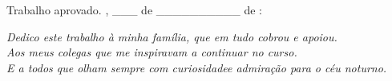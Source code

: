 \documentclass[
	12pt,
	openany,
	oneside,
	a4paper,
	english,
	brazil
]{abntex2}
\begin{document}
\begin{folhadeaprovacao}
  \begin{center}
    {\ABNTEXchapterfont\large\imprimirautor}
    \vspace*{\fill}\vspace*{\fill}
    \begin{center}
      \ABNTEXchapterfont\bfseries\Large\imprimirtitulo
    \end{center}
    \vspace*{\fill}
    \hspace{.45\textwidth}
    \begin{minipage}{.5\textwidth}
        \imprimirpreambulo
    \end{minipage}%
    \vspace*{\fill}
  \end{center}

  Trabalho aprovado. \imprimirlocal, \_\_\_ de \_\_\_\_\_\_\_\_\_\_ de \imprimirdata:


  \begin{center}
    \vspace*{0.5cm}
    {\large\imprimirlocal}
    \par
    {\large\imprimirdata}
    \vspace*{1cm}
  \end{center}
\end{folhadeaprovacao}

\begin{dedicatoria}
   \vspace*{\fill}
   \centering
   \noindent
   \textit{Dedico este trabalho à minha família, que em tudo cobrou e apoiou.\\
   Aos meus colegas que me inspiravam a continuar no curso.\\
   E a todos que olham sempre com curiosidadee admiração para o céu noturno.} \vspace*{\fill}
\end{dedicatoria}
\end{document}
